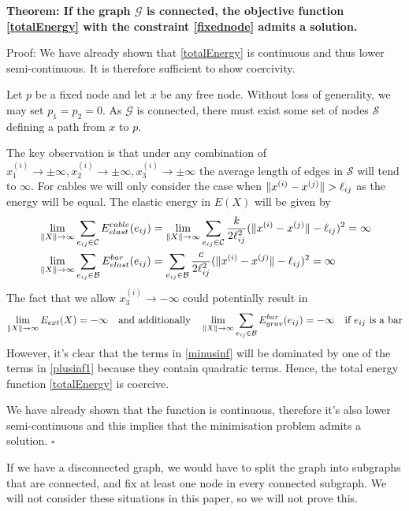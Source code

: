 \textbf{Theorem: If the graph $\mathcal{G}$ is connected, the objective function \eqref{totalEnergy} with the constraint \eqref{fixednode} admits a solution.}

Proof:
We have already shown that \eqref{totalEnergy} is continuous and thus lower semi-continuous. It is therefore sufficient to show coercivity.

Let $p$ be a fixed node and let $x$ be any free node. Without loss of generality, we may set $p_1 = p_2 = 0$. As $\mathcal{G}$ is connected, there must exist some set of nodes $\mathcal{S}$ defining a path from $x$ to $p$.

The key observation is that under any combination of $x^{(i)}_1 \to \pm \infty,x^{(i)}_2 \to \pm \infty,x^{(i)}_3 \to \pm \infty$ the average length of edges in $\mathcal{S}$ will tend to $\infty$. For cables we will only consider the case when $\lVert x^{(i)} - x^{(j)}\rVert > \ell_{ij}$ as the energy will be equal. The elastic energy in $E(X)$ will be given by
\begin{equation} 
\label{plusinf1}
\begin{aligned}
     &\lim\limits_{\rVert X \lVert \to \infty} \sum\limits_{e_{ij} \in \mathcal{C}}E^{cable}_{elast}(e_{ij}) =\lim\limits_{\rVert X \lVert \to \infty} \sum\limits_{e_{ij} \in \mathcal{C}} \frac{k}{2 \ell_{ij} ^2}(\lVert x^{(i)} - x^{(j)} \rVert-\ell_{ij})^2 = \infty \\
     &\lim\limits_{\rVert X \lVert \to \infty} \sum\limits_{e_{ij} \in \mathcal{B }}E^{bar}_{elast}(e_{ij}) = 
      \sum\limits_{e_{ij} \in \mathcal{B}} \frac{c}{2 \ell_{ij} ^2}(\lVert x^{(i)} - x^{(j)} \rVert-\ell_{ij})^2 = \infty
\end{aligned} 
\end{equation}
The fact that we allow $x^{(i)}_3 \to -\infty$ could potentially result in
\begin{equation}
  \lim\limits_{\rVert X \lVert \to \infty} E_{ext}(X) = -\infty
\quad\text{and additionally}\quad
\lim\limits_{\rVert X \lVert \to \infty} \sum\limits_{e_{ij} \in \mathcal{B}} E^{bar}_{grav}(e_{ij}) = -\infty \quad \text{if $e_{ij}$ is a bar}
\label{minusinf}
\end{equation} 
However, it's clear that the terms in \eqref{minusinf} will be dominated by one of the terms in \eqref{plusinf1} because they contain quadratic terms. Hence, the total energy function \eqref{totalEnergy} is coercive.

We have already shown that the function is continuous, therefore it's also lower semi-continuous and this implies that the minimisation problem admits a solution. \hfill $\square$

If we have a disconnected graph, we would have to split the graph into subgraphs that are connected, and fix at least one node in every connected subgraph. We will not consider these situations in this paper, so we will not prove this.


